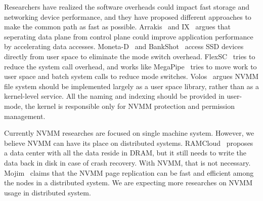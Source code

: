 Researchers have realized the software overheads could impact
fast storage and networking device performance,
and they have proposed different approaches to make the common path as fast
as possible.
Arrakis~\cite{Arrakis} and IX~\cite{IX} argues that seperating data plane
from control plane could improve application performance by accelerating
data accesses. Moneta-D~\cite{monetad} and BankShot~\cite{BankShot} access
SSD devices directly from user space to eliminate the mode switch overhead.
FlexSC~\cite{FlexSC} tries to reduce the system call overhead,
and works like MegaPipe~\cite{MegaPipe} tries to move work to user space and
batch system calls to reduce mode switches. Volos~\cite{system-scm} argues
NVMM file system should be implemented largely as a user space library, rather
than as a kernel-level service. All the naming and indexing should be provided
in user-mode, the kernel is responsible only for NVMM protection and permission
management.

Currently NVMM researches are focused on single machine system. However,
we believe NVMM can have its place on distributed systems.
RAMCloud~\cite{RAMCloud} proposes a data center with all the data reside in DRAM, but it still needs to write the data back in disk in case of crash recovery.
With NVMM, that is not necessary. Mojim~\cite{mojim} claims that the NVMM page
replication can be fast and efficient among the nodes in a distributed system.
We are expecting more researches on NVMM usage in distributed system.

